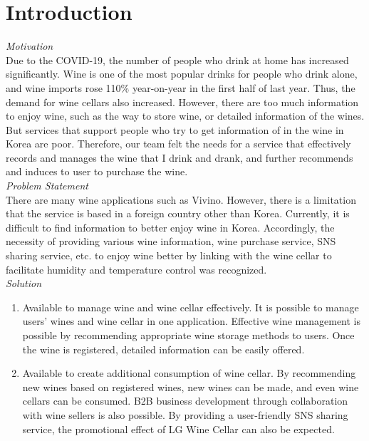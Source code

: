 \documentclass[conference]{IEEEtran}
\numberwithin{figure}{subsection}
\begin{document}
\section{Introduction} 
\noindent\textit{Motivation}\\
\indent Due to the COVID-19, the number of people who drink at home has increased significantly. Wine is one of the most popular drinks for people who drink alone, and wine imports rose 110\% year-on-year in the first half of last year. Thus, the demand for wine cellars also increased. However, there are too much information to enjoy wine, such as the way to store wine, or detailed information of the wines. But services that support people who try to get information of in the wine in Korea are poor. Therefore, our team felt the needs for a service that effectively records and manages the wine that I drink and drank, and further recommends and induces to user to purchase the wine.\\

\noindent\textit{Problem Statement}\\
\indent There are many wine applications such as Vivino. However, there is a limitation that the service is based in a foreign country other than Korea. Currently, it is difficult to find information to better enjoy wine in Korea. Accordingly, the necessity of providing various wine information, wine purchase service, SNS sharing service, etc. to enjoy wine better by linking with the wine cellar to facilitate humidity and temperature control was recognized.\\ 

\noindent\textit{Solution}
\begin{enumerate}
    \item Available to manage wine and wine cellar effectively. 
    It is possible to manage users' wines and wine cellar in one
    application. Effective wine management is possible by recommending
    appropriate wine storage methods to users. Once the wine is registered, detailed information can be
    easily offered.
    \item Available to create additional consumption of wine cellar. By recommending new wines based on registered wines, new wines can be made, and even wine cellars can be consumed. B2B business development through collaboration with wine sellers is also possible. By providing a user-friendly SNS sharing service, the promotional effect of LG Wine Cellar can also be expected.\\
\end{enumerate}
\end{document}
